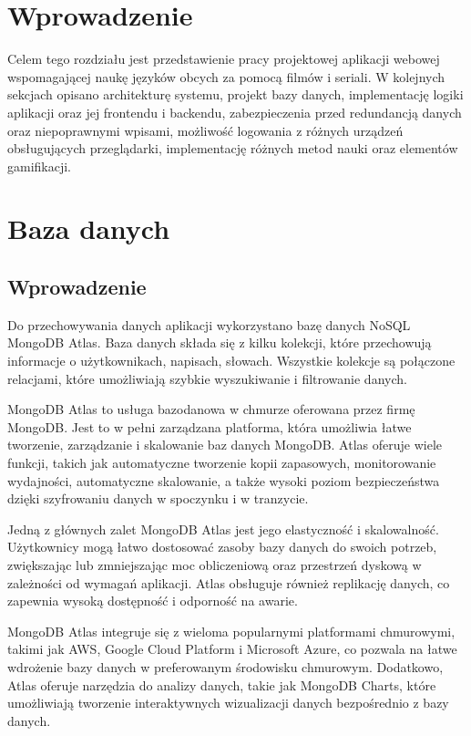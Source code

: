 



\section{Wprowadzenie}
Celem tego rozdziału jest przedstawienie pracy projektowej aplikacji webowej wspomagającej naukę języków obcych za pomocą filmów i seriali. W kolejnych sekcjach opisano architekturę systemu, projekt bazy danych, implementację logiki aplikacji oraz jej frontendu i backendu, zabezpieczenia przed redundancją danych oraz niepoprawnymi wpisami, możliwość logowania z różnych urządzeń obsługujących przeglądarki, implementację różnych metod nauki oraz elementów gamifikacji.

\section{Baza danych}

\subsection{Wprowadzenie}
Do przechowywania danych aplikacji wykorzystano bazę danych NoSQL MongoDB Atlas. Baza danych składa się z kilku kolekcji, które przechowują informacje o użytkownikach, napisach, słowach. Wszystkie kolekcje są połączone relacjami, które umożliwiają szybkie wyszukiwanie i filtrowanie danych.

MongoDB Atlas to usługa bazodanowa w chmurze oferowana przez firmę MongoDB. Jest to w pełni zarządzana platforma, która umożliwia łatwe tworzenie, zarządzanie i skalowanie baz danych MongoDB. Atlas oferuje wiele funkcji, takich jak automatyczne tworzenie kopii zapasowych, monitorowanie wydajności, automatyczne skalowanie, a także wysoki poziom bezpieczeństwa dzięki szyfrowaniu danych w spoczynku i w tranzycie.

Jedną z głównych zalet MongoDB Atlas jest jego elastyczność i skalowalność. Użytkownicy mogą łatwo dostosować zasoby bazy danych do swoich potrzeb, zwiększając lub zmniejszając moc obliczeniową oraz przestrzeń dyskową w zależności od wymagań aplikacji. Atlas obsługuje również replikację danych, co zapewnia wysoką dostępność i odporność na awarie.

MongoDB Atlas integruje się z wieloma popularnymi platformami chmurowymi, takimi jak AWS, Google Cloud Platform i Microsoft Azure, co pozwala na łatwe wdrożenie bazy danych w preferowanym środowisku chmurowym. Dodatkowo, Atlas oferuje narzędzia do analizy danych, takie jak MongoDB Charts, które umożliwiają tworzenie interaktywnych wizualizacji danych bezpośrednio z bazy danych. 


